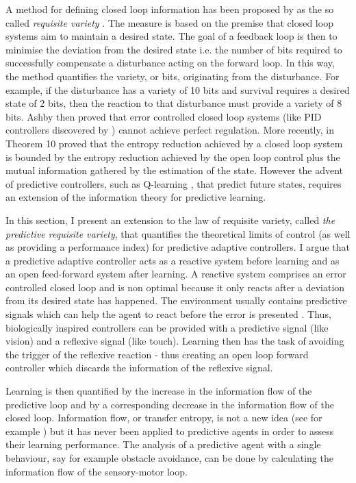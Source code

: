 A method for defining closed loop information has been proposed by \citet{Ashby1956:IntroCybernetics}
as the so called \textit{requisite variety} .
The measure is based on the premise that closed loop systems aim to maintain
a desired state.
The goal of a feedback loop is then to minimise the deviation from the desired
state i.e. the number of bits required to successfully
compensate a disturbance acting on the forward loop. In this
way, the method quantifies the variety, or bits, originating from the
disturbance. For example, if the disturbance has a variety of 10 bits and
survival requires a desired state of 2 bits, then the reaction to that disturbance
must provide a variety of 8 bits.
Ashby then proved that error controlled closed loop systems (like PID controllers 
discovered by \citealt{PID}) cannot achieve perfect regulation.
More recently, \citealt{PhysRevLett.84.1156} in Theorem 10 proved
that the entropy reduction achieved by a closed loop system
is bounded by the entropy reduction achieved by the open loop control plus
the mutual information gathered by the estimation of the state.
However the advent of predictive controllers, such as Q-learning \citep{TD},
that predict future states, requires an extension of the information theory for
predictive learning.

In this section, I present an extension to
the law of requisite variety, called \textit{the predictive requisite variety},
that quantifies the theoretical limits of control (as well as providing a performance index)
for predictive adaptive controllers.
I argue that a predictive adaptive controller acts as a reactive system before learning
and as an open feed-forward system after learning.
A reactive system comprises an error controlled closed
loop and is non optimal because it only reacts after a
deviation from its desired state has happened.
The environment usually contains predictive signals which can help the agent to
react before the error is presented \citep{Verschure2003}. Thus, biologically inspired controllers
can be provided with a predictive signal (like vision) and a reflexive signal (like touch).
Learning then has the task of avoiding the trigger of the reflexive reaction -
thus creating an open loop forward controller which discards
the information of the reflexive signal.

Learning is then quantified by the increase in the information flow of the predictive
loop and by a corresponding decrease in the information flow of the closed loop.
Information flow, or transfer entropy, is not a new idea (see for
example \citep{infoFlow,transferEntropy}) but it has never been applied to
predictive agents in order to assess their learning performance.
The analysis of a predictive agent with a single behaviour, say for
example obstacle avoidance, can be done by calculating the information flow of the
sensory-motor loop.

